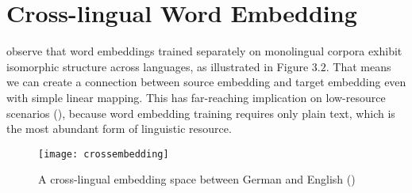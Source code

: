 %
%
\section{ Cross-lingual Word Embedding}
  \cite{mikolov2013exploiting}  observe that word embeddings trained separately on monolingual corpora exhibit isomorphic structure across languages, as illustrated in Figure $3.2$. That means we can create a connection between source embedding and target embedding even with simple linear mapping. This has far-reaching implication on low-resource scenarios (\cite{adams2017cross}), because word embedding training requires only plain text, which is the most abundant form of linguistic resource.
\begin{figure}[t]
	\texttt{[image: crossembedding]}
	\centering
	\caption{A cross-lingual embedding space between German and English (\cite{ruder2017survey})}
\end{figure}


